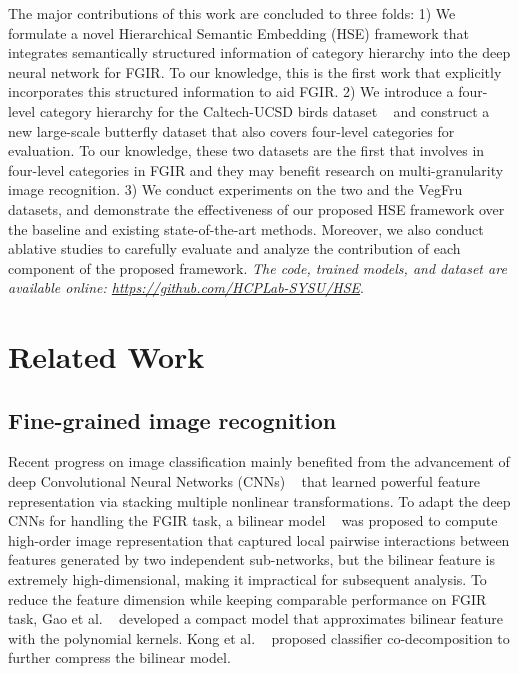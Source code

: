 \documentclass[sigconf]{acmart}
\begin{document}
The major contributions of this work are concluded to three folds: 1) We formulate a novel Hierarchical Semantic Embedding (HSE) framework that integrates semantically structured information of category hierarchy into the deep neural network for FGIR. To our knowledge, this is the first work that explicitly incorporates this structured information to aid FGIR. 2) We introduce a four-level category hierarchy for the Caltech-UCSD birds dataset ~\cite{wah2011caltech} and construct a new large-scale butterfly dataset that also covers four-level categories for evaluation. To our knowledge, these two datasets are the first that involves in four-level categories in FGIR and they may benefit research on multi-granularity image recognition. 3) We conduct experiments on the two and the VegFru ~\cite{hou2017vegfru} datasets, and demonstrate the effectiveness of our proposed HSE framework over the baseline and existing state-of-the-art methods. Moreover, we also conduct ablative studies to carefully evaluate and analyze the contribution of each component of the proposed framework. \emph{The code, trained models, and dataset are available online: \url{https://github.com/HCPLab-SYSU/HSE}}.






\section{Related Work}

\subsection{Fine-grained image recognition}
Recent progress on image classification mainly benefited from the advancement of deep Convolutional Neural Networks (CNNs) ~\cite{lecun1998gradient,krizhevsky2012imagenet,simonyan2014very,he2016deep,chen2018learning,chen2016disc} that learned powerful feature representation via stacking multiple nonlinear transformations. To adapt the deep CNNs for handling the FGIR task, a bilinear model ~\cite{lin2015bilinear} was proposed to compute high-order image representation that captured local pairwise interactions between features generated by two independent sub-networks, but the bilinear feature is extremely high-dimensional, making it impractical for subsequent analysis. To reduce the feature dimension while keeping comparable performance on FGIR task, Gao et al. ~\cite{gao2016compact} developed a compact model that approximates bilinear feature with the polynomial kernels. Kong et al. ~\cite{kong2016low} proposed classifier co-decomposition to further compress the bilinear model.
\end{document}
